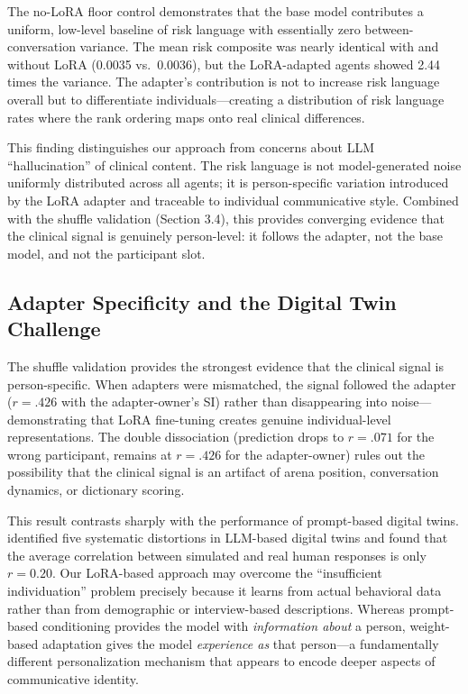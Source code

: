 \documentclass[review,12pt,authoryear]{elsarticle}
\begin{document}
The no-LoRA floor control demonstrates that the base model contributes a uniform, low-level baseline of risk language with essentially zero between-conversation variance. The mean risk composite was nearly identical with and without LoRA (0.0035 vs.\ 0.0036), but the LoRA-adapted agents showed 2.44 times the variance. The adapter's contribution is not to increase risk language overall but to differentiate individuals---creating a distribution of risk language rates where the rank ordering maps onto real clinical differences.

This finding distinguishes our approach from concerns about LLM ``hallucination'' of clinical content. The risk language is not model-generated noise uniformly distributed across all agents; it is person-specific variation introduced by the LoRA adapter and traceable to individual communicative style. Combined with the shuffle validation (Section 3.4), this provides converging evidence that the clinical signal is genuinely person-level: it follows the adapter, not the base model, and not the participant slot.

\subsection{Adapter Specificity and the Digital Twin Challenge}

The shuffle validation provides the strongest evidence that the clinical signal is person-specific. When adapters were mismatched, the signal followed the adapter ($r = .426$ with the adapter-owner's SI) rather than disappearing into noise---demonstrating that LoRA fine-tuning creates genuine individual-level representations. The double dissociation (prediction drops to $r = .071$ for the wrong participant, remains at $r = .426$ for the adapter-owner) rules out the possibility that the clinical signal is an artifact of arena position, conversation dynamics, or dictionary scoring.

This result contrasts sharply with the performance of prompt-based digital twins. \citet{peng2025funhouse} identified five systematic distortions in LLM-based digital twins and found that the average correlation between simulated and real human responses is only $r = 0.20$. Our LoRA-based approach may overcome the ``insufficient individuation'' problem precisely because it learns from actual behavioral data rather than from demographic or interview-based descriptions. Whereas prompt-based conditioning provides the model with \textit{information about} a person, weight-based adaptation gives the model \textit{experience as} that person---a fundamentally different personalization mechanism that appears to encode deeper aspects of communicative identity.
\end{document}
